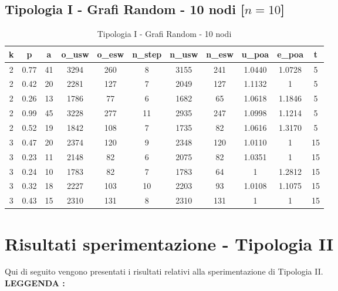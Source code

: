 \subsection{Tipologia I - Grafi Random - 10 nodi [$n=10$]}

\begin{table}[H]
\centering
\scalebox{0.9} {
\begin{tabular}{|c|c|c|c|c|c|c|c|c|c|c|}
\hline
\textbf{k} & \textbf{p} & \textbf{a} & \textbf{o\_usw} & \textbf{o\_esw} & \textbf{n\_step} & \textbf{n\_usw} & \textbf{n\_esw} & \textbf{u\_poa} & \textbf{e\_poa} & \textbf{t} \\ \hline
2 & 0.77 & 41 & 3294 & 260 & 8 & 3155 & 241 & 1.0440 & 1.0728 & 5 \\ \hline
2 & 0.42 & 20 & 2281 & 127 & 7 & 2049 & 127 & 1.1132 & 1 & 5 \\ \hline
2 & 0.26 & 13 & 1786 & 77 & 6 & 1682 & 65 & 1.0618 & 1.1846 & 5 \\ \hline
2 & 0.99 & 45 & 3228 & 277 & 11 & 2935 & 247 & 1.0998 & 1.1214 & 5 \\ \hline
2 & 0.52 & 19 & 1842 & 108 & 7 & 1735 & 82 & 1.0616 & 1.3170 & 5 \\ \hline
3 & 0.47 & 20 & 2374 & 120 & 9 & 2348 & 120 & 1.0110 & 1 & 15 \\ \hline
3 & 0.23 & 11 & 2148 & 82 & 6 & 2075 & 82 & 1.0351 & 1 & 15 \\ \hline
3 & 0.24 & 10 & 1783 & 82 & 7 & 1783 & 64 & 1 & 1.2812 & 15 \\ \hline
3 & 0.32 & 18 & 2227 & 103 & 10 & 2203 & 93 & 1.0108 & 1.1075 & 15 \\ \hline
3 & 0.43 & 15 & 2310 & 131 & 8 & 2310 & 131 & 1 & 1 & 15 \\ \hline
\end{tabular}
}
\caption{Tipologia I - Grafi Random - 10 nodi}
\label{tab:sperimentazione-tipo1-10nodi}
\end{table}

\section{Risultati sperimentazione - Tipologia II}
\justify
Qui di seguito vengono presentati i risultati relativi alla sperimentazione di Tipologia II.\\

\textbf{LEGGENDA : }

